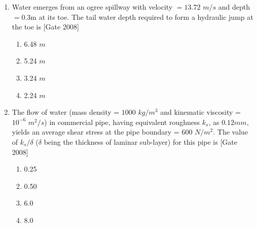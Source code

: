 \documentclass[journal]{IEEEtran}
\begin{document}
\begin{enumerate}
	\item Water emerges from an ogree spillway with velocity $= 13.72$ $m/s$ and depth $= 0.3$m at its toe. The tail water depth required to form a hydraulic jump at the toe is \hfill [Gate 2008]
\begin{multicols}{2}
	\begin{enumerate}
		\item 6.48 $m$
		\item 5.24 $m$
		\item 3.24 $m$
		\item 2.24 $m$
	\end{enumerate}
\end{multicols}
	\item The flow of water (mass density = $1000$ $kg/m^3$ and kinematic viscosity = $10^{-6}$ $m^2/s$) in commercial pipe, having equivalent roughness $k_s$, as $0.12mm$, yields an average shear stress at the pipe boundary = $600$ $N/m^2$. The value of $k_s / \delta$ ($\delta$ being the thickness of laminar sub-layer) for this pipe is  \hfill [Gate 2008]
		\begin{multicols}{2}
	\begin{enumerate}
		\item 0.25
		\item 0.50
		\item 6.0
		\item 8.0
	\end{enumerate}
\end{multicols}


\end{enumerate}
\end{document}
